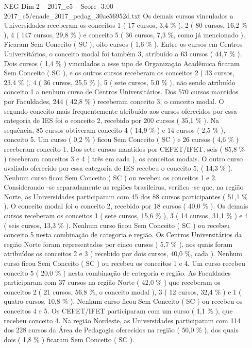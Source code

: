 \begin{textsample}{NEG Dim 2 – 2017\_c5 – Score -3.00 – 2017\_c5/enade\_2017\_pedag\_30ae56952d.txt}
Os demais cursos vinculados a Universidades receberam os conceitos 1 ( 17 cursos, 3,4 \% ), 2 ( 80 cursos, 16,2 \% ), 4 ( 147 cursos, 29,8 \% ) e conceito 5 ( 36 cursos, 7,3 \%, como já mencionado ).
Ficaram Sem Conceito ( SC ), oito cursos ( 1,6 \% ).
Entre os cursos em Centros Universitários, o conceito modal foi também 3, atribuído a 63 cursos ( 44,7 \% ).
Dois cursos ( 1,4 \% ) vinculados a esse tipo de Organização Acadêmica ficaram Sem Conceito ( SC ), e os outros cursos receberam os conceitos 2 ( 33 cursos, 23,4 \% ), 4 ( 36 cursos, 25,5 \% ), 5 ( sete cursos, 5,0 \% ), não sendo atribuído conceito 1 a nenhum curso de Centros Universitários.
Dos 570 cursos mantidos por Faculdades, 244 ( 42,8 \% ) receberam conceito 3, o conceito modal.
O segundo conceito mais frequentemente atribuído aos cursos oferecidos por essa categoria de IES foi o conceito 2, recebido por 200 cursos ( 35,1 \% ).
Na sequência, 85 cursos obtiveram conceito 4 ( 14,9 \% ) e 14 cursos ( 2,5 \% ), conceito 5.
Um curso ( 0,2 \% ) ficou Sem Conceito ( SC ) e 26 cursos ( 4,6 \% ) receberam conceito 1.
Dos sete cursos mantidos por CEFET/IFET, seis ( 85,8 \% ) receberam conceitos 3 e 4 ( três em cada ), os conceitos modais.
O outro curso avaliado oferecido por essa categoria de IES recebeu o conceito 5, ( 14,3 \% ).
Nenhum curso ficou Sem Conceito ( SC ) ou recebeu os conceitos 1 e 2.
Considerando -se separadamente as regiões brasileiras, verifica -se que, na região Norte, as Universidades participaram com 45 dos 88 cursos participantes ( 51,1 \% ).
O conceito modal foi o conceito 2, recebido por 18 cursos ( 40,0 \% ).
Os demais cursos receberam os conceitos 1 ( sete cursos, 15,6 \% ), 3 ( 14 cursos, 31,1 \% ) e 4 ( seis cursos, 13,3 \% ).
Nenhum curso ficou Sem Conceito ( SC ) ou recebeu conceito 5 nesta combinação de categoria e região.
Os Centros Universitários da região Norte foram representados por cinco cursos ( 5,7 \% ), aos quais foram atribuídos os conceitos 2 e 3 ( recebido por dois cursos, 40,0 \%, cada ).
Nenhum curso ficou Sem Conceito ( SC ) ou recebeu os conceitos 1 e 4.
Um curso recebeu conceito 5 ( 20,0 \% ) nesta combinação de categoria e região.
As Faculdades participaram com 37 cursos na região Norte ( 42,0 \% ) que receberam os conceitos 2 ( 21 cursos, 56,8 \%, o conceito modal ), 3 ( 12 cursos, 32,4 \% ) e 1 ( quatro cursos, 10,8 \% ).
Nenhum curso ficou Sem Conceito ( SC ) ou recebeu os conceitos 4 e 5.
Os CEFET/IFET participaram com um curso ( 1,1 \% ), que recebeu conceito 4.
Na região Nordeste, as Universidades participaram com 114 dos 228 cursos da Área de Pedagogia oferecidos na região ( 50,0 \% ), dos quais dois ( 1,8 \% ) ficaram Sem Conceito ( SC ).

\end{textsample}
